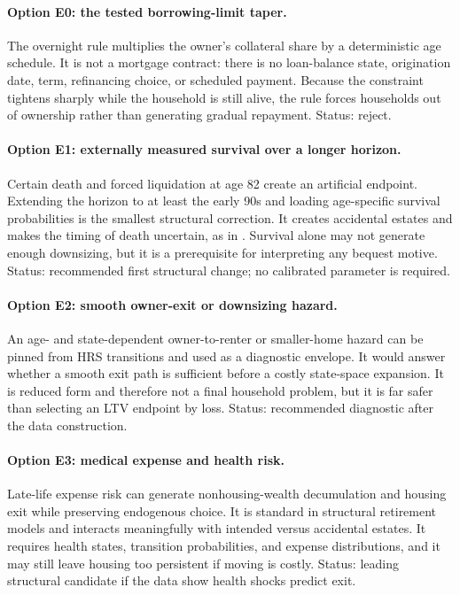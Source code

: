 \documentclass[10pt]{article}
\newcommand{\bad}{\textcolor{red!65!black}{reject}}
\begin{document}
\paragraph{Option E0: the tested borrowing-limit taper.}
The overnight rule multiplies the owner's collateral share by a deterministic
age schedule. It is not a mortgage contract: there is no loan-balance state,
origination date, term, refinancing choice, or scheduled payment. Because the
constraint tightens sharply while the household is still alive, the rule
forces households out of ownership rather than generating gradual repayment.
Status: \bad{}.

\paragraph{Option E1: externally measured survival over a longer horizon.}
Certain death and forced liquidation at age 82 create an artificial endpoint.
Extending the horizon to at least the early 90s and loading age-specific
survival probabilities is the smallest structural correction. It creates
accidental estates and makes the timing of death uncertain, as in
\citet{hurd1989}. Survival alone may not generate enough downsizing, but it is
a prerequisite for interpreting any bequest motive. Status: recommended first
structural change; no calibrated parameter is required.

\paragraph{Option E2: smooth owner-exit or downsizing hazard.}
An age- and state-dependent owner-to-renter or smaller-home hazard can be pinned
from HRS transitions and used as a diagnostic envelope. It would answer whether
a smooth exit path is sufficient before a costly state-space expansion. It is
reduced form and therefore not a final household problem, but it is far safer
than selecting an LTV endpoint by loss. Status: recommended diagnostic after
the data construction.

\paragraph{Option E3: medical expense and health risk.}
Late-life expense risk can generate nonhousing-wealth decumulation and housing
exit while preserving endogenous choice. It is standard in structural
retirement models and interacts meaningfully with intended versus accidental
estates. It requires health states, transition probabilities, and expense
distributions, and it may still leave housing too persistent if moving is
costly. Status: leading structural candidate if the data show health shocks
predict exit.
\end{document}
